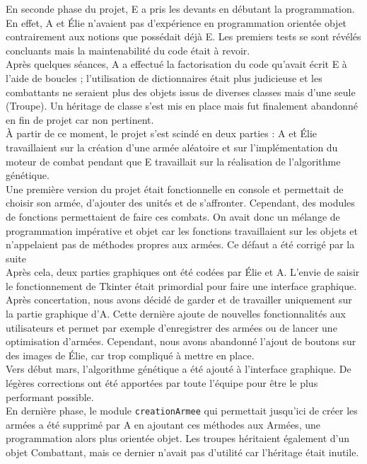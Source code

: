 \documentclass[a4paper]{article} %
\begin{document}
En seconde phase du projet, E a pris les devants en débutant la programmation. En effet, A et Élie n'avaient pas d'expérience en programmation orientée objet contrairement aux notions que possédait déjà E. Les premiers tests se sont révélés concluants mais la maintenabilité du code était à revoir.\\

Après quelques séances, A a effectué la factorisation du code qu'avait écrit E à l'aide de boucles ; l'utilisation de dictionnaires était plus judicieuse et les combattants ne seraient plus des objets issus de diverses classes mais d'une seule (Troupe). Un héritage de classe s'est mis en place mais fut finalement abandonné en fin de projet car non pertinent.\\

À partir de ce moment, le projet s'est scindé en deux parties : A et Élie travaillaient sur la création d'une armée aléatoire et sur l'implémentation du moteur de combat pendant que E travaillait sur la réalisation de l'algorithme génétique.\\

Une première version du projet était fonctionnelle en console et permettait de choisir son armée, d'ajouter des unités et de s'affronter. Cependant, des modules de fonctions permettaient de faire ces combats. On avait donc un mélange de programmation impérative et objet car les fonctions travaillaient sur les objets et n'appelaient pas de méthodes propres aux armées. Ce défaut a été corrigé par la suite\\

Après cela, deux parties graphiques ont été codées par Élie et A. L'envie de saisir le fonctionnement de Tkinter était primordial pour faire une interface graphique. Après concertation, nous avons décidé de garder et de travailler uniquement sur la partie graphique d'A. Cette dernière ajoute de nouvelles fonctionnalités aux utilisateurs et permet par exemple d'enregistrer des armées ou de lancer une optimisation d'armées. Cependant, nous avons abandonné l'ajout de boutons sur des images de Élie, car trop compliqué à mettre en place.\\

Vers début mars, l'algorithme génétique a été ajouté à l'interface graphique. De légères corrections ont été apportées par toute l'équipe pour être le plus performant possible.\\

En dernière phase, le module \texttt{creationArmee} qui permettait jusqu'ici de créer les armées a été supprimé par A en ajoutant ces méthodes aux Armées, une programmation alors plus orientée objet. Les troupes héritaient également d'un objet Combattant, mais ce dernier n'avait pas d'utilité car l'héritage était inutile.\\
\end{document}
